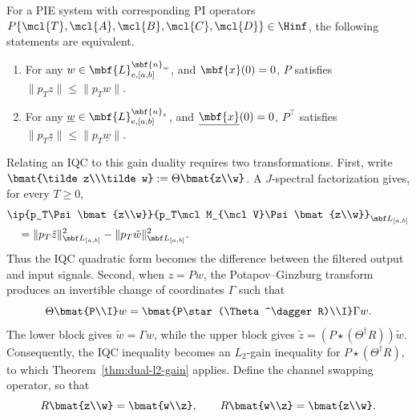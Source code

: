 \begin{theorem}\label{thm:dual-l2-gain}
For a PIE system with corresponding PI operators $P\{\mcl{T}, \mcl{A}, \mcl{B},
\mcl{C}, \mcl{D}\}\in\Hinf$, the following statements are equivalent.
\begin{enumerate}
\item For any $w\in\mbf{L}_{\mathrm{e},[a,b]}^{\mbf{n}_w}$, and $\mbf{x}(0)=0$, $P$
satisfies $\|p_T {z}\| \leq \|p_T {w}\|$.
\item For any $\underline{w}\in\mbf{L}_{\mathrm{e},[a,b]}^{\mbf{n}_z}$, and
$\underline{\mbf{x}}(0)=0$, $P^\top$ satisfies $\|p_T \underline{z}\| \leq
\|p_T \underline{w}\|$.
\end{enumerate}
\end{theorem}
Relating an IQC to this gain duality requires two transformations. First,
write $\bmat{\tilde z\\\tilde w}:=\Theta\bmat{z\\w}$. A $J$-spectral
factorization gives, for every $T\geq0$,
\begin{equation*}
\begin{aligned}
&\ip{p_T\Psi\bmat{z\\w}}
{p_T\mcl M_{\mcl V}\Psi\bmat{z\\w}}_{\mbf L_{[a,b]}}\\
&\quad=
\|p_T\tilde z\|_{\mbf L_{[a,b]}}^2
-\|p_T\tilde w\|_{\mbf L_{[a,b]}}^2.
\end{aligned}
\end{equation*}
Thus the IQC quadratic form becomes the difference between the filtered
output and input signals. Second, when $z=Pw$, the Potapov--Ginzburg
transform produces an invertible change of coordinates $\Gamma$ such that
\begin{equation*}
\Theta\bmat{P\\I}w
=
\bmat{P\star(\Theta^\dagger R)\\I}\Gamma w.
\end{equation*}
The lower block gives $\tilde w=\Gamma w$, while the upper block gives
$\tilde z=(P\star(\Theta^\dagger R))\tilde w$. Consequently, the IQC inequality
becomes an $L_2$-gain inequality for $P\star(\Theta^\dagger R)$, to which
Theorem~\ref{thm:dual-l2-gain} applies. Define the channel swapping operator, so
that
\[
R\bmat{z\\w}=\bmat{w\\z},
\qquad
R\bmat{w\\z}=\bmat{z\\w}.
\]

